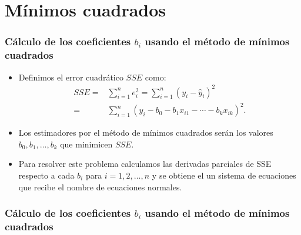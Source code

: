 \section{Mínimos cuadrados}
\begin{frame}
\frametitle{Cálculo de los coeficientes $b_i$ usando el método de mínimos cuadrados}
\begin{itemize}
\item<2->{Definimos el error cuadrático $SSE$ como:
$$
\begin{array}{rl}
SSE=&\sum\limits_{i=1}^n
e^2_i=\sum\limits_{i=1}^n (y_i-\hat{y}_i)^2 \\ 
=&\sum\limits_{i=1}^n (y_i-b_0-b_1 x_{i 1}-\cdots -b_{k} x_{ik})^2.
\end{array}$$}
\item<3->{Los estimadores por el método de mínimos cuadrados serán los
valores $b_0,b_1,\ldots, b_k$ que minimicen $SSE$.
}
\item<4->{Para resolver este problema calculamos las derivadas parciales de
SSE respecto a cada $b_i$ para $i=1,2,\ldots,n$ y se obtiene el
un sistema de ecuaciones que recibe el nombre de ecuaciones normales.
}
\end{itemize}
\end{frame}

\begin{frame}
\frametitle{Cálculo de los coeficientes $b_i$ usando el método de mínimos cuadrados}
\end{frame}

